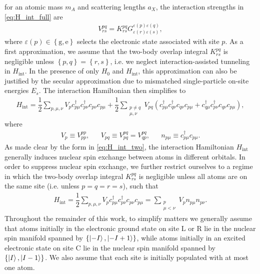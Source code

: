 \documentclass[aps,nofootinbib,notitlepage,11pt]{revtex4-1}
\renewcommand{\t}{\text} %
\newcommand{\f}[2]{\dfrac{#1}{#2}} %
\newcommand{\p}[1]{\left(#1\right)} %
\renewcommand{\set}[1]{\left\{#1\right\}} %
\newcommand{\g}{\text{g}}
\newcommand{\e}{\text{e}}
\renewcommand{\L}{\text{L}}
\newcommand{\C}{\text{C}}
\newcommand{\R}{\text{R}}
\newcommand{\1}{\mathds{1}}
\begin{document}
for an atomic mass $m_A$ and scattering lengths $a_X$, the interaction
strengths in \eqref{eq:H_int_full} are
\begin{align}
  V^{pq}_{rs} = K^{pq}_{rs}
  G^{\varepsilon\p{p}\varepsilon\p{q}}_{\varepsilon\p{r}\varepsilon\p{s}},
\end{align}
where $\varepsilon\p{p}\in\set{\g,\e}$ selects the electronic state
associated with site $p$.  As a first approximation, we assume that
the two-body overlap integral $K^{pq}_{rs}$ is negligible unless
$\set{p,q}=\set{r,s}$, i.e. we neglect interaction-assisted tunneling
in $H_{\t{int}}$.  In the presence of only $H_0$ and $H_{\t{int}}$,
this approximation can also be justified by the secular approximation
due to mismatched single-particle on-site energies $E_s$.  The
interaction Hamiltonian then simplifies to
\begin{align}
  H_{\t{int}}
  = \f12 \sum_{p,\mu,\nu} V_p c_{p\mu}^\dag c_{p\nu}^\dag c_{p\nu} c_{p\mu}
  + \f12 \sum_{\substack{p\ne q\\\mu,\nu}} V_{pq}
  \p{c_{p\mu}^\dag c_{q\nu}^\dag c_{q\nu} c_{p\mu}
    + c_{q\mu}^\dag c_{p\nu}^\dag c_{q\nu} c_{p\mu}},
  \label{eq:H_int_two}
\end{align}
where
\begin{align}
  V_p \equiv V^{pp}_{pp},
  &&
  V_{pq} \equiv V^{pq}_{pq} = V^{pq}_{qp},
  &&
  n_{p\mu} \equiv c_{p\mu}^\dag c_{p\mu}.
\end{align}
As made clear by the form in \eqref{eq:H_int_two}, the interaction
Hamiltonian $H_{\t{int}}$ generally induces nuclear spin exchange
between atoms in different orbitals.  In order to suppress nuclear
spin exchange, we further restrict ourselves to a regime in which the
two-body overlap integral $K^{pq}_{rs}$ is negligible unless all atoms
are on the same site (i.e. unless $p=q=r=s$), such that
\begin{align}
  H_{\t{int}}
  = \f12 \sum_{p,\mu,\nu} V_p c_{p\mu}^\dag c_{p\nu}^\dag c_{p\nu} c_{p\mu}
  = \sum_{\substack{p\\\mu<\nu}} V_p n_{p\mu} n_{p\nu}.
  \label{eq:H_int}
\end{align}
Throughout the remainder of this work, to simplify matters we
generally assume that atoms initially in the electronic ground state
on site $\L$ or $\R$ lie in the nuclear spin manifold spanned by
$\set{\ket{-I},\ket{-I+1}}$, while atoms initially in an excited
electronic state on site $\C$ lie in the nuclear spin manifold spanned
by $\set{\ket{I},\ket{I-1}}$.  We also assume that each site is
initially populated with at most one atom.
\end{document}
